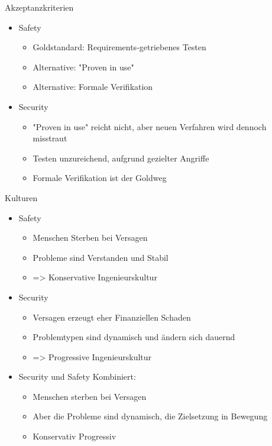 %
\begin{frame}[T]{Akzeptanzkriterien}
  \begin{itemize}
    \item Safety
    \begin{itemize}
      \item Goldstandard: Requirements-getriebenes Testen %
      \item Alternative: "Proven in use" %
      \item Alternative: Formale Verifikation %
    \end{itemize}

    \item Security
    \begin{itemize}
      \item "Proven in use" reicht nicht, aber neuen Verfahren wird dennoch misstraut
      \item Testen unzureichend, aufgrund gezielter Angriffe
      \item Formale Verifikation ist der Goldweg
    \end{itemize}

  \end{itemize}
\end{frame}

\begin{frame}[T]{Kulturen}
  \begin{itemize}
    \item Safety
    \begin{itemize}
      \item Menschen Sterben bei Versagen
      \item Probleme sind Verstanden und Stabil
      \item => Konservative Ingenieurskultur
    \end{itemize}

    \item Security
    \begin{itemize}
      \item Versagen erzeugt eher Finanziellen Schaden
      \item Problemtypen sind dynamisch und ändern sich dauernd
      \item => Progressive Ingenieurskultur
    \end{itemize}

    \item Security und Safety Kombiniert:
    \begin{itemize}
      \item Menschen sterben bei Versagen
      \item Aber die Probleme sind dynamisch, die Zielsetzung in Bewegung
      \item Konservativ  Progressiv
    \end{itemize}
  \end{itemize}
\end{frame}


